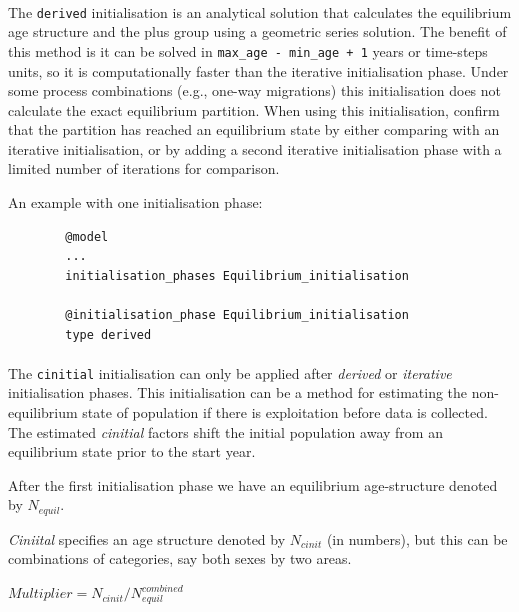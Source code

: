 \paragraph{}\label{sec:InitialisationPhase-Derived}

The \texttt{derived} initialisation is an analytical solution that calculates the equilibrium age structure and the plus group using a geometric series solution. The benefit of this method is it can be solved in \texttt{max\_age - min\_age + 1} years or time-steps units, so it is computationally faster than the iterative initialisation phase. Under some process combinations (e.g., one-way migrations) this initialisation does not calculate the exact equilibrium partition. When using this initialisation, confirm that the partition has reached an equilibrium state by either comparing with an iterative initialisation, or by adding a second iterative initialisation phase with a limited number of iterations for comparison.

An example with one initialisation phase:

{\small{\begin{verbatim}
		@model
		...
		initialisation_phases Equilibrium_initialisation

		@initialisation_phase Equilibrium_initialisation
		type derived
		\end{verbatim}}}

\paragraph{}\label{sec:InitialisationPhase-Cinitial} 

The \texttt{cinitial} initialisation can only be applied after \textit{derived} or \textit{iterative} initialisation phases. This initialisation can be a method for estimating the non-equilibrium state of population if there is exploitation before data is collected. The estimated \textit{cinitial} factors shift the initial population away from an equilibrium state prior to the start year.

After the first initialisation phase we have an equilibrium age-structure denoted by $N_{equil}$.

\textit{Ciniital} specifies an age structure denoted by $N_{cinit}$ (in numbers), but this can be combinations of categories, say both sexes by two areas.

$Multiplier =  N_{cinit} / N_{equil}^{combined}$

